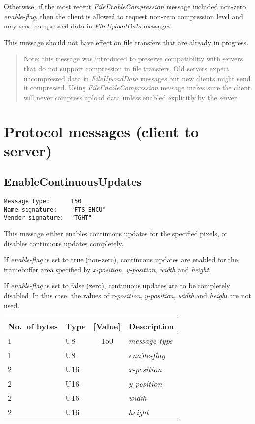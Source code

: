 \documentclass[a4paper]{article}
\newcommand{\typestr}[1]{\textit{#1}}
\begin{document}
Otherwise, if the most recent \typestr{FileEnableCompression} message
included non-zero \typestr{enable-flag}, then the client is allowed to
request non-zero compression level and may send compressed data in
\typestr{FileUploadData} messages.

This message should not have effect on file transfers that are already
in progress.

\begin{quote}
Note: this message was introduced to preserve compatibility with
servers that do not support compression in file transfers. Old servers
expect uncompressed data in \typestr{FileUploadData} messages but new
clients might send it compressed. Using
\typestr{FileEnableCompression} message makes sure the client will
never compress upload data unless enabled explicitly by the server.
\end{quote}

\newpage
\section{Protocol messages (client to server)}

\subsection{EnableContinuousUpdates}
\begin{verbatim}
Message type:      150
Name signature:    "FTS_ENCU"
Vendor signature:  "TGHT"
\end{verbatim}

This message either enables continuous updates for the specified
pixels, or disables continuous updates completely.

If \typestr{enable-flag} is set to true (non-zero), continuous updates
are enabled for the framebuffer area specified by
\typestr{x-position}, \typestr{y-position}, \typestr{width} and
\typestr{height}.

If \typestr{enable-flag} is set to false (zero), continuous updates
are to be completely disabled. In this case, the values of
\typestr{x-position}, \typestr{y-position}, \typestr{width} and
\typestr{height} are not used.

\begin{tabular}{l|lc|l} \hline
No.\ of bytes & Type & [Value] & Description \\ \hline
1 & U8  & 150 & \typestr{message-type} \\
1 & U8  &     & \typestr{enable-flag} \\
2 & U16 &     & \typestr{x-position} \\
2 & U16 &     & \typestr{y-position} \\
2 & U16 &     & \typestr{width} \\
2 & U16 &     & \typestr{height} \\
\hline\end{tabular}
\end{document}
